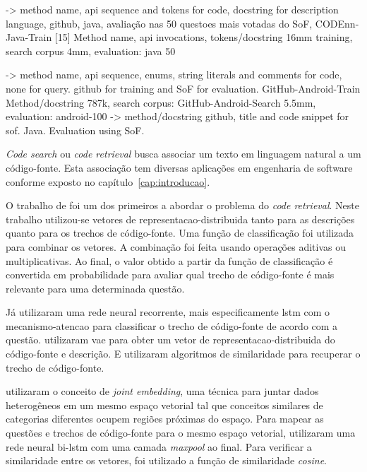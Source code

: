 \cite{Gu-deep-code-search:2018} -> method name, api sequence and tokens for code, docstring for description language, github, java, avaliação nas 50 questoes mais votadas do SoF, CODEnn-Java-Train [15] Method name, api invocations, tokens/docstring 16mm training, search corpus 4mm, evaluation: java 50

\citep{Sachdev-neural-code-search:2018} -> method name, api sequence, enums, string literals and comments for code, none for query. github for training and SoF for evaluation. GitHub-Android-Train Method/docstring 787k, search corpus: GitHub-Android-Search 5.5mm, evaluation: android-100
\cite{cambronero-deep-learning-code-search:2019} -> method/docstring github, title and code snippet for sof. Java. Evaluation using SoF.


\textit{Code search} ou \textit{code retrieval} busca associar um texto em linguagem natural a um código-fonte. Esta associação tem diversas aplicações em engenharia de software conforme exposto no capítulo~\ref{cap:introducao}.

O trabalho de \cite{Allamanis-bimodal-source-code-natural-language:2015} foi um dos primeiros a abordar o problema do \textit{code retrieval}. Neste trabalho utilizou-se vetores de \gls{representacao-distribuida} tanto para as descrições quanto para os trechos de código-fonte. Uma função de classificação foi utilizada para combinar os vetores. A combinação foi feita usando operações aditivas ou multiplicativas. Ao final, o valor obtido a partir da função de classificação é convertida em probabilidade para avaliar qual trecho de código-fonte é mais relevante para uma determinada questão.

Já \cite{iyer-etal-2016-summarizing} utilizaram uma rede neural recorrente, mais especificamente \acrshort{lstm} com o \gls{mecanismo-atencao} para classificar o trecho de código-fonte de acordo com a questão. \cite{Chen-bi-variational-autoencoder:2018} utilizaram \acrfull{vae} para obter um vetor de \gls{representacao-distribuida} do código-fonte e descrição. E utilizaram algoritmos de similaridade para recuperar o trecho de código-fonte.

\cite{Gu-deep-code-search:2018} utilizaram o conceito de \textit{joint embedding}, uma técnica para juntar dados heterogêneos em um mesmo espaço vetorial tal que conceitos similares de categorias diferentes ocupem regiões próximas do espaço. Para mapear as questões e trechos de código-fonte para o mesmo espaço vetorial, \cite{Gu-deep-code-search:2018} utilizaram uma rede neural bi-\acrshort{lstm} com uma camada \textit{maxpool} ao final. Para verificar a similaridade entre os vetores, foi utilizado a função de similaridade \textit{cosine}.

